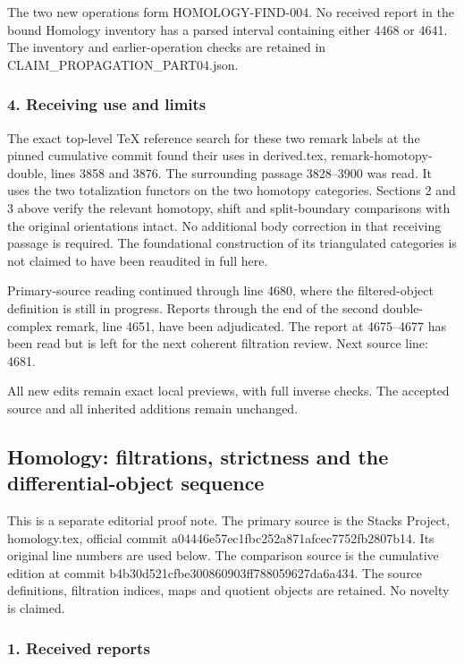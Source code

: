 \documentclass[11pt]{article}
\begin{document}
The two new operations form HOMOLOGY-FIND-004. No received report in the bound Homology inventory has a parsed interval containing either 4468 or 4641. The inventory and earlier-operation checks are retained in CLAIM\_PROPAGATION\_PART04.json.

\subsubsection{4. Receiving use and limits}\label{receiving-use-and-limits}

The exact top-level TeX reference search for these two remark labels at the pinned cumulative commit found their uses in derived.tex, remark-homotopy-double, lines 3858 and 3876. The surrounding passage 3828--3900 was read. It uses the two totalization functors on the two homotopy categories. Sections 2 and 3 above verify the relevant homotopy, shift and split-boundary comparisons with the original orientations intact. No additional body correction in that receiving passage is required. The foundational construction of its triangulated categories is not claimed to have been reaudited in full here.

Primary-source reading continued through line 4680, where the filtered-object definition is still in progress. Reports through the end of the second double-complex remark, line 4651, have been adjudicated. The report at 4675--4677 has been read but is left for the next coherent filtration review. Next source line: 4681.

All new edits remain exact local previews, with full inverse checks. The accepted source and all inherited additions remain unchanged.
\clearpage
\subsection{Homology: filtrations, strictness and the differential-object sequence}\label{homology-filtrations-strictness-and-the-differential-object-sequence}

This is a separate editorial proof note. The primary source is the Stacks Project, homology.tex, official commit a04446e57ec1fbc252a871afcec7752fb2807b14. Its original line numbers are used below. The comparison source is the cumulative edition at commit b4b30d521cfbe300860903ff788059627da6a434. The source definitions, filtration indices, maps and quotient objects are retained. No novelty is claimed.

\subsubsection{1. Received reports}\label{received-reports}
\end{document}
